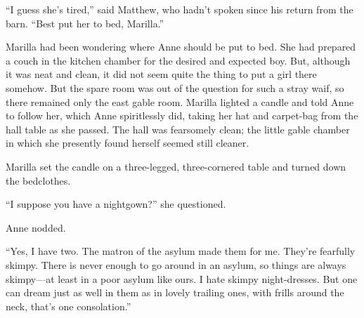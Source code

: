 \documentclass[a4paper]{article}
\begin{document}
{\huge ``I guess she’s tired,'' said Matthew, who hadn’t spoken since his return from the barn. ``Best put her to bed, Marilla.''

Marilla had been wondering where Anne should be put to bed. She had prepared a couch in the kitchen chamber for the desired and expected boy. But, although it was neat and clean, it did not seem quite the thing to put a girl there somehow. But the spare room was out of the question for such a stray waif, so there remained only the east gable room. Marilla lighted a candle and told Anne to follow her, which Anne spiritlessly did, taking her hat and carpet-bag from the hall table as she passed. The hall was fearsomely clean; the little gable chamber in which she presently found herself seemed still cleaner.}

{\Huge Marilla set the candle on a three-legged, three-cornered table and turned down the bedclothes.

``I suppose you have a nightgown?'' she questioned.

Anne nodded.

``Yes, I have two. The matron of the asylum made them for me. They’re fearfully skimpy. There is never enough to go around in an asylum, so things are always skimpy---at least in a poor asylum like ours. I hate skimpy night-dresses. But one can dream just as well in them as in lovely trailing ones, with frills around the neck, that’s one consolation.''}
\end{document}
